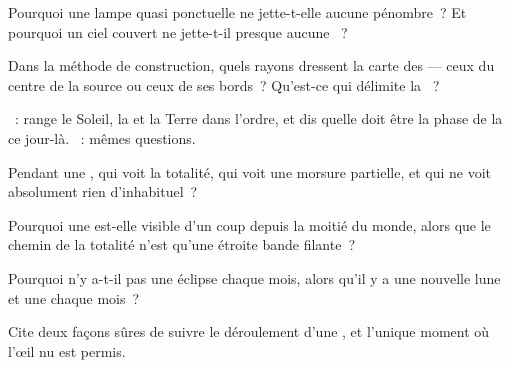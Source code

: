 \begin{exercise}[$\star$]\label{exo:g7:shadows-eclipses:2}
Pourquoi une lampe quasi ponctuelle ne jette-t-elle aucune pénombre~?
Et pourquoi un ciel couvert ne jette-t-il presque aucune ~?
\end{exercise}

\begin{exercise}[$\star$]\label{exo:g7:shadows-eclipses:3}
Dans la méthode de construction, quels rayons dressent la carte des
 --- ceux du centre de la source ou ceux de ses bords~?
Qu'est-ce qui délimite la ~?
\end{exercise}

\begin{exercise}[$\star$]\label{exo:g7:shadows-eclipses:4}
~: range le Soleil, la  et la Terre dans
l'ordre, et dis quelle doit être la phase de la  ce jour-là.
~: mêmes questions.
\end{exercise}

\begin{exercise}[$\star$]\label{exo:g7:shadows-eclipses:5}
Pendant une , qui voit la totalité, qui voit une
morsure partielle, et qui ne voit absolument rien d'inhabituel~?
\end{exercise}

\begin{exercise}[$\star$]\label{exo:g7:shadows-eclipses:6}
Pourquoi une  est-elle visible d'un coup depuis la
moitié du monde, alors que le chemin de la totalité n'est qu'une
étroite bande filante~?
\end{exercise}

\begin{exercise}[$\star$]\label{exo:g7:shadows-eclipses:7}
Pourquoi n'y a-t-il pas une éclipse chaque mois, alors qu'il y a une
nouvelle lune et une  chaque mois~?
\end{exercise}

\begin{exercise}[$\star$]\label{exo:g7:shadows-eclipses:8}
Cite deux façons sûres de suivre le déroulement d'une , et l'unique moment où l'œil nu est permis.
\end{exercise}

